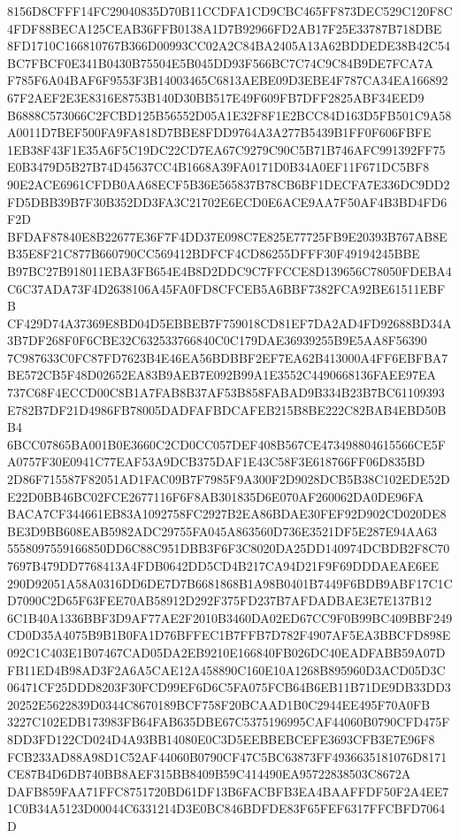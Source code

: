 \documentclass[UTF8,fontset=fandol,zihao=-4,a4paper]{ctexart}
\begin{document}
{{8156D8CFFF14FC29040835D70B11CCDFA1CD9CBC465FF873DEC529C120F8C4FDF88BECA125CEAB36FFB0138A1D7B92966FD2AB17F25E33787B718DBE
8FD1710C166810767B366D00993CC02A2C84BA2405A13A62BDDEDE38B42C54BC7FBCF0E341B0430B75504E5B045DD93F566BC7C74C9C84B9DE7FCA7A
F785F6A04BAF6F9553F3B14003465C6813AEBE09D3EBE4F787CA34EA16689267F2AEF2E3E8316E8753B140D30BB517E49F609FB7DFF2825ABF34EED9
B6888C573066C2FCBD125B56552D05A1E32F8F1E2BCC84D163D5FB501C9A58A0011D7BEF500FA9FA818D7BBE8FDD9764A3A277B5439B1FF0F606FBFE
1EB38F43F1E35A6F5C19DC22CD7EA67C9279C90C5B71B746AFC991392FF75E0B3479D5B27B74D45637CC4B1668A39FA0171D0B34A0EF11F671DC5BF8
90E2ACE6961CFDB0AA68ECF5B36E565837B78CB6BF1DECFA7E336DC9DD2FD5DBB39B7F30B352DD3FA3C21702E6ECD0E6ACE9AA7F50AF4B3BD4FD6F2D
BFDAF87840E8B22677E36F7F4DD37E098C7E825E77725FB9E20393B767AB8EB35E8F21C877B660790CC569412BDFCF4CD86255DFFF30F49194245BBE
B97BC27B918011EBA3FB654E4B8D2DDC9C7FFCCE8D139656C78050FDEBA4C6C37ADA73F4D2638106A45FA0FD8CFCEB5A6BBF7382FCA92BE61511EBFB
CF429D74A37369E8BD04D5EBBEB7F759018CD81EF7DA2AD4FD92688BD34A3B7DF268F0F6CBE32C632533766840C0C179DAE36939255B9E5AA8F56390
7C987633C0FC87FD7623B4E46EA56BDBBF2EF7EA62B413000A4FF6EBFBA7BE572CB5F48D02652EA83B9AEB7E092B99A1E3552C4490668136FAEE97EA
737C68F4ECCD00C8B1A7FAB8B37AF53B858FABAD9B334B23B7BC61109393E782B7DF21D4986FB78005DADFAFBDCAFEB215B8BE222C82BAB4EBD50BB4
6BCC07865BA001B0E3660C2CD0CC057DEF408B567CE473498804615566CE5FA0757F30E0941C77EAF53A9DCB375DAF1E43C58F3E618766FF06D835BD
2D86F715587F82051AD1FAC09B7F7985F9A300F2D9028DCB5B38C102EDE52DE22D0BB46BC02FCE2677116F6F8AB301835D6E070AF260062DA0DE96FA
BACA7CF344661EB83A1092758FC2927B2EA86BDAE30FEF92D902CD020DE8BE3D9BB608EAB5982ADC29755FA045A863560D736E3521DF5E287E94AA63
5558097559166850DD6C88C951DBB3F6F3C8020DA25DD140974DCBDB2F8C707697B479DD7768413A4FDB0642DD5CD4B217CA94D21F9F69DDDAEAE6EE
290D92051A58A0316DD6DE7D7B6681868B1A98B0401B7449F6BDB9ABF17C1CD7090C2D65F63FEE70AB58912D292F375FD237B7AFDADBAE3E7E137B12
6C1B40A1336BBF3D9AF77AE2F2010B3460DA02ED67CC9F0B99BC409BBF249CD0D35A4075B9B1B0FA1D76BFFEC1B7FFB7D782F4907AF5EA3BBCFD898E
092C1C403E1B07467CAD05DA2EB9210E166840FB026DC40EADFABB59A07DFB11ED4B98AD3F2A6A5CAE12A458890C160E10A1268B895960D3ACD05D3C
06471CF25DDD8203F30FCD99EF6D6C5FA075FCB64B6EB11B71DE9DB33DD320252E5622839D0344C8670189BCF758F20BCAAD1B0C2944EE495F70A0FB
3227C102EDB173983FB64FAB635DBE67C5375196995CAF44060B0790CFD475F8DD3FD122CD024D4A93BB14080E0C3D5EEBBEBCEFE3693CFB3E7E96F8
FCB233AD88A98D1C52AF44060B0790CF47C5BC63873FF4936635181076D8171CE87B4D6DB740BB8AEF315BB8409B59C414490EA95722838503C8672A
DAFB859FAA71FFC8751720BD61DF13B6FACBFB3EA4BAAFFDF50F2A4EE71C0B34A5123D00044C6331214D3E0BC846BDFDE83F65FEF6317FFCBFD7064D
}}
\end{document}

